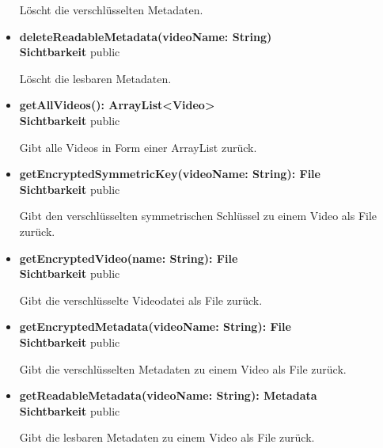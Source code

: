 \begin{itemize}
Löscht die verschlüsselten Metadaten.

\item \textbf{deleteReadableMetadata(videoName: String)}\hfill\\
\textbf{Sichtbarkeit} public

Löscht die lesbaren Metadaten.

\item \textbf{getAllVideos(): ArrayList<Video>}\hfill\\
\textbf{Sichtbarkeit} public

Gibt alle Videos in Form einer ArrayList zurück.

\item \textbf{getEncryptedSymmetricKey(videoName: String): File}\hfill\\
\textbf{Sichtbarkeit} public

Gibt den verschlüsselten symmetrischen Schlüssel zu einem Video als File zurück.

\item \textbf{getEncryptedVideo(name: String): File}\hfill\\
\textbf{Sichtbarkeit} public

Gibt die verschlüsselte Videodatei als File zurück.

\item \textbf{getEncryptedMetadata(videoName: String): File}\hfill\\
\textbf{Sichtbarkeit} public

Gibt die verschlüsselten Metadaten zu einem Video als File zurück.

\item \textbf{getReadableMetadata(videoName: String): Metadata}\hfill\\
\textbf{Sichtbarkeit} public

Gibt die lesbaren Metadaten zu einem Video als File zurück.
\end{itemize}